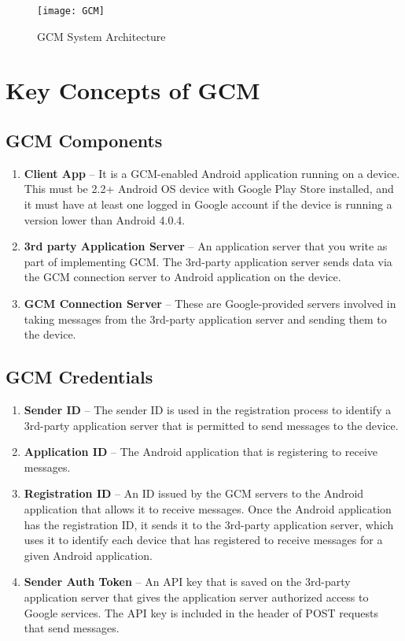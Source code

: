 \begin{figure}[here]
\begin{center}   
\texttt{[image: GCM]}
\caption{GCM System Architecture}
\label{fig:GCM}
\end{center}
\end{figure}

\section {Key Concepts of GCM}

\subsection {GCM Components}
\begin {enumerate}
  \item\textbf { Client App} – It is a GCM-enabled Android application running on a device. This must be 2.2+ Android OS device with Google Play Store installed, and it must have at least one logged in Google account if the device is running a version lower than Android 4.0.4.

   \item\textbf { 3rd party Application Server }– An application server that you write as part of implementing GCM. The 3rd-party application server sends data via the GCM connection server to Android application on the device.

    \item\textbf {GCM Connection Server} – These are Google-provided servers involved in taking messages from the 3rd-party application server and sending them to the device.

\end {enumerate}

\subsection {GCM Credentials}
\begin {enumerate}
  \item\textbf {Sender ID} – The sender ID is used in the registration process to identify a 3rd-party application server that is permitted to send messages to the device.

    \item\textbf { Application ID} – The Android application that is registering to receive messages.

    \item\textbf { Registration ID } – An ID issued by the GCM servers to the Android application that allows it to receive messages. Once the Android application has the registration ID, it sends it to the 3rd-party application server, which uses it to identify each device that has registered to receive messages for a given Android application.
    
 \item\textbf {    Sender Auth Token} – An API key that is saved on the 3rd-party application server that gives the application server authorized access to Google services. The API key is included in the header of POST requests that send messages.
\end {enumerate}

